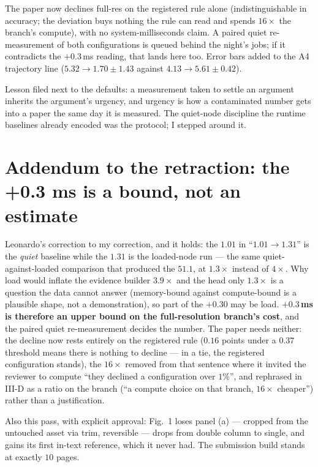 \documentclass[11pt,a4paper]{article}
\begin{document}
The paper now declines full-res on the registered rule alone
(indistinguishable in accuracy; the deviation buys nothing the rule can read
and spends $16\times$ the branch's compute), with no system-milliseconds
claim. A paired quiet re-measurement of both configurations is queued behind
the night's jobs; if it contradicts the $+0.3$\,ms reading, that lands here
too. Error bars added to the A4 trajectory line
($5.32 \to 1.70\pm1.43$ against $4.13 \to 5.61\pm0.42$).

Lesson filed next to the defaults: a measurement taken to settle an argument
inherits the argument's urgency, and urgency is how a contaminated number
gets into a paper the same day it is measured. The quiet-node discipline the
runtime baselines already encoded was the protocol; I stepped around it.



\section*{Addendum to the retraction: the +0.3 ms is a bound, not an estimate}

Leonardo's correction to my correction, and it holds: the $1.01$ in
``$1.01 \to 1.31$'' is the \emph{quiet} baseline while the $1.31$ is the
loaded-node run --- the same quiet-against-loaded comparison that produced
the $51.1$, at $1.3\times$ instead of $4\times$. Why load would inflate the
evidence builder $3.9\times$ and the head only $1.3\times$ is a question the
data cannot answer (memory-bound against compute-bound is a plausible shape,
not a demonstration), so part of the $+0.30$ may be load. \textbf{$+0.3$\,ms
is therefore an upper bound on the full-resolution branch's cost}, and the
paired quiet re-measurement decides the number. The paper needs neither: the
decline now rests entirely on the registered rule ($0.16$ points under a
$0.37$ threshold means there is nothing to decline --- in a tie, the
registered configuration stands), the $16\times$ removed from that sentence
where it invited the reviewer to compute ``they declined a configuration
over $1\%$'', and rephrased in III-D as a ratio on the branch
(``a compute choice on that branch, $16\times$ cheaper'') rather than a
justification.

Also this pass, with explicit approval: Fig.~1 loses panel (a) --- cropped
from the untouched asset via trim, reversible --- drops from double column to
single, and gains its first in-text reference, which it never had. The
submission build stands at exactly $10$ pages.
\end{document}
